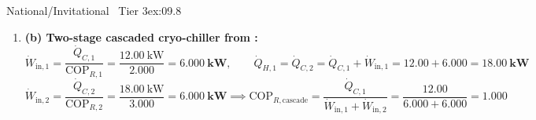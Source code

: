 \begin{workedexample}{National/Invitational \textbar\ Tier 3}{ex:09.8}
\begin{enumerate}
  \item \textbf{(b) Two-stage cascaded cryo-chiller from :}
  \[
    \dot{W}_{\mathrm{in},1} = \frac{\dot{Q}_{C,1}}{\mathrm{COP}_{R,1}} = \frac{\SI{12.00}{\kilo\watt}}{2.000} = \mathbf{\SI{6.000}{\kilo\watt}}, \qquad \dot{Q}_{H,1} = \dot{Q}_{C,2} = \dot{Q}_{C,1} + \dot{W}_{\mathrm{in},1} = 12.00 + 6.000 = \mathbf{\SI{18.00}{\kilo\watt}}
  \]
  \[
    \dot{W}_{\mathrm{in},2} = \frac{\dot{Q}_{C,2}}{\mathrm{COP}_{R,2}} = \frac{\SI{18.00}{\kilo\watt}}{3.000} = \mathbf{\SI{6.000}{\kilo\watt}} \implies \mathrm{COP}_{R,\mathrm{cascade}} = \frac{\dot{Q}_{C,1}}{\dot{W}_{\mathrm{in},1} + \dot{W}_{\mathrm{in},2}} = \frac{12.00}{6.000 + 6.000} = \mathbf{1.000}
  \]
\end{enumerate}
\end{workedexample}

